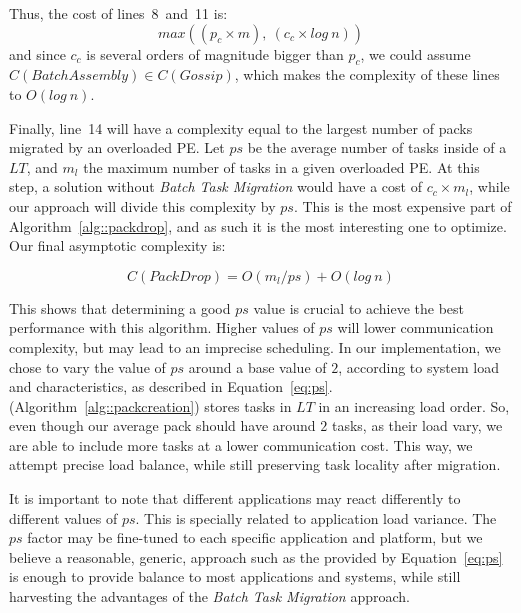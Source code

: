 Thus, the cost of lines~8~and~11 is:
\begin{equation}
 max((p_c\times m),\ (c_c\times log\ n))
\end{equation}
and since $c_c$ is several orders of magnitude bigger than $p_c$, we could assume $C(BatchAssembly)\in C(Gossip)$, which makes the 
complexity of these lines to $O(log\ n)$.

Finally, line~14 will have a complexity equal to the largest number of packs migrated by an overloaded PE.
Let $ps$ be the average number of tasks inside of a $LT$, and $m_l$ the maximum number of tasks in a given overloaded PE.
At this step, a solution without \textit{Batch Task Migration} would have a cost of $c_c\times m_l$, while our approach will divide this complexity by $ps$. 
This is the most expensive part of Algorithm~\ref{alg::packdrop}, and as such it is the most interesting one to optimize.
Our final asymptotic complexity is:

\begin{equation}
 C(PackDrop) = O(m_l/ps) + O(log\ n)
 \label{eq:worstcase}
\end{equation}

This shows that determining a good $ps$ value is crucial to achieve the best performance with this algorithm.
Higher values of $ps$ will lower communication complexity, but may lead to an imprecise scheduling.
In our implementation, we chose to vary the value of $ps$ around a base value of $2$, according to system load and characteristics, as described in Equation~\ref{eq:ps}.
\batchassembly (Algorithm~\ref{alg::packcreation}) stores tasks in $LT$ in an increasing load order.
So, even though our average pack should have around $2$ tasks, as their load vary, we are able to include more tasks at a lower communication cost.
This way, we attempt precise load balance, while still preserving task locality after migration.

It is important to note that different applications may react differently to different values of $ps$.
This is specially related to application load variance.
The $ps$ factor may be fine-tuned to each specific application and platform, but we believe a reasonable, generic, approach such as the provided by Equation~\ref{eq:ps} is enough to provide balance to most applications and systems, while still harvesting the advantages of the \textit{Batch Task Migration} approach.
